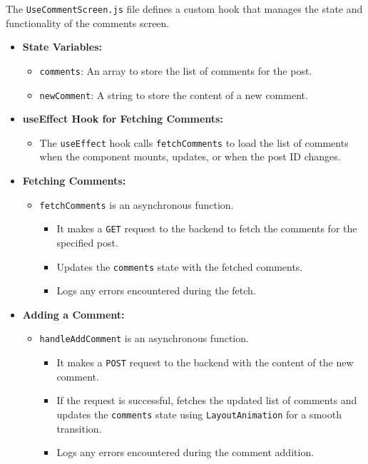 The \texttt{UseCommentScreen.js} file defines a custom hook that manages the state and functionality of the comments screen.

\begin{itemize}
    \item \textbf{State Variables:}
    \begin{itemize}
        \item \texttt{comments}: An array to store the list of comments for the post.
        \item \texttt{newComment}: A string to store the content of a new comment.
    \end{itemize}

    \item \textbf{useEffect Hook for Fetching Comments:}
    \begin{itemize}
        \item The \texttt{useEffect} hook calls \texttt{fetchComments} to load the list of comments when the component mounts, updates, or when the post ID changes.
    \end{itemize}

    \item \textbf{Fetching Comments:}
    \begin{itemize}
        \item \texttt{fetchComments} is an asynchronous function.
        \begin{itemize}
            \item It makes a \texttt{GET} request to the backend to fetch the comments for the specified post.
            \item Updates the \texttt{comments} state with the fetched comments.
            \item Logs any errors encountered during the fetch.
        \end{itemize}
    \end{itemize}

    \item \textbf{Adding a Comment:}
    \begin{itemize}
        \item \texttt{handleAddComment} is an asynchronous function.
        \begin{itemize}
            \item It makes a \texttt{POST} request to the backend with the content of the new comment.
            \item If the request is successful, fetches the updated list of comments and updates the \texttt{comments} state using \texttt{LayoutAnimation} for a smooth transition.
            \item Logs any errors encountered during the comment addition.
        \end{itemize}
    \end{itemize}


\end{itemize}
